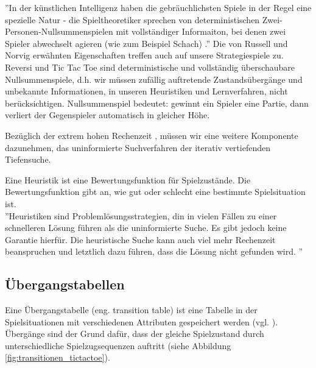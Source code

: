 ''In der künstlichen Intelligenz haben die gebräuchlichsten Spiele in der Regel eine spezielle Natur - die Spieltheoretiker sprechen von deterministischen Zwei-Personen-Nullsummenspielen mit vollständiger Informaiton, bei denen zwei Spieler abwechselt agieren (wie zum Beispiel Schach) \cite[206]{Russell}.'' Die von Russell und Norvig erwähnten Eigenschaften treffen auch auf unsere Strategiespiele zu. Reversi und Tic Tac Toe sind deterministische und vollständig überschaubare Nullsummenspiele, d.h. wir müssen zufällig auftretende Zustandsübergänge und unbekannte Informationen, in unseren Heuristiken und Lernverfahren, nicht berücksichtigen. Nullsummenspiel bedeutet: gewinnt ein Spieler eine Partie, dann verliert der Gegenspieler automatisch in gleicher Höhe.












Bezüglich der extrem hohen Rechenzeit , müssen wir eine weitere Komponente dazunehmen, das uninformierte Suchverfahren der iterativ vertiefenden Tiefensuche.

Eine Heuristik ist eine Bewertungsfunktion für Spielzustände. Die Bewertungsfunktion gibt an, wie gut oder schlecht eine bestimmte Spielsituation ist. \\

''Heuristiken sind Problemlösungsstrategien, din in vielen Fällen zu einer schnelleren Lösung führen als die uninformierte Suche. Es gibt jedoch keine Garantie hierfür. Die heuristische Suche kann auch viel mehr Rechenzeit beanspruchen und letztlich dazu führen, dass die Lösung nicht gefunden wird.  \cite[105]{Ertel}''\\






















\subsection{Übergangstabellen}
\label{subsec:Übergangstabellen}
Eine Übergangstabelle (eng. transition table) ist eine Tabelle in der Spielsituationen mit verschiedenen Attributen gespeichert werden (vgl. \cite[215\psq]{Russell}). Übergänge sind der Grund dafür, dass der gleiche Spielzustand durch unterschiedliche Spielzugsequenzen auftritt (siehe Abbildung \ref{fig:transitionen_tictactoe}). \\

